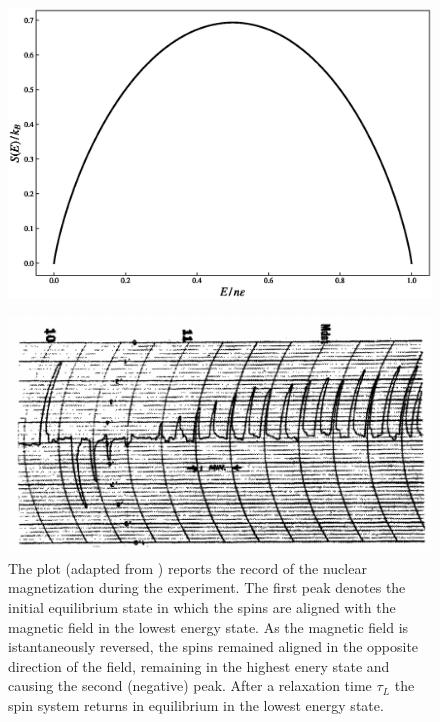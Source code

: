 \begin{figure}
    \centering 
    \includegraphics[scale=0.5]{./images/entropy_TLS}
    \caption{}
    \label{fig:PandP_switch}
\end{figure}
\begin{figure}[htbp]
    \centering 
    \includegraphics[scale=0.5]{./images/PurcellPound.png}
    \caption{The plot (adapted from \cite{PandP}) reports the record of the nuclear magnetization during the experiment. The first peak denotes
    the initial equilibrium state in which the spins are aligned with the magnetic field in the lowest energy state. As the magnetic field is istantaneously reversed,
    the spins remained aligned in the opposite direction of the field, remaining in the highest enery state and causing the second (negative) peak. After a relaxation time
    $\tau_L$ the spin system returns in equilibrium in the lowest energy state.}
    \label{fig:PandP}
\end{figure}